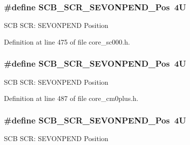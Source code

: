\subsubsection[{\texorpdfstring{S\+C\+B\+\_\+\+S\+C\+R\+\_\+\+S\+E\+V\+O\+N\+P\+E\+N\+D\+\_\+\+Pos}{SCB_SCR_SEVONPEND_Pos}}]{\setlength{\rightskip}{0pt plus 5cm}\#define S\+C\+B\+\_\+\+S\+C\+R\+\_\+\+S\+E\+V\+O\+N\+P\+E\+N\+D\+\_\+\+Pos~4U}\hypertarget{group___c_m_s_i_s___s_c_b_ga3bddcec40aeaf3d3a998446100fa0e44}{}\label{group___c_m_s_i_s___s_c_b_ga3bddcec40aeaf3d3a998446100fa0e44}
S\+CB S\+CR\+: S\+E\+V\+O\+N\+P\+E\+ND Position 

Definition at line 475 of file core\+\_\+sc000.\+h.

\subsubsection[{\texorpdfstring{S\+C\+B\+\_\+\+S\+C\+R\+\_\+\+S\+E\+V\+O\+N\+P\+E\+N\+D\+\_\+\+Pos}{SCB_SCR_SEVONPEND_Pos}}]{\setlength{\rightskip}{0pt plus 5cm}\#define S\+C\+B\+\_\+\+S\+C\+R\+\_\+\+S\+E\+V\+O\+N\+P\+E\+N\+D\+\_\+\+Pos~4U}\hypertarget{group___c_m_s_i_s___s_c_b_ga3bddcec40aeaf3d3a998446100fa0e44}{}\label{group___c_m_s_i_s___s_c_b_ga3bddcec40aeaf3d3a998446100fa0e44}
S\+CB S\+CR\+: S\+E\+V\+O\+N\+P\+E\+ND Position 

Definition at line 487 of file core\+\_\+cm0plus.\+h.

\subsubsection[{\texorpdfstring{S\+C\+B\+\_\+\+S\+C\+R\+\_\+\+S\+E\+V\+O\+N\+P\+E\+N\+D\+\_\+\+Pos}{SCB_SCR_SEVONPEND_Pos}}]{\setlength{\rightskip}{0pt plus 5cm}\#define S\+C\+B\+\_\+\+S\+C\+R\+\_\+\+S\+E\+V\+O\+N\+P\+E\+N\+D\+\_\+\+Pos~4U}\hypertarget{group___c_m_s_i_s___s_c_b_ga3bddcec40aeaf3d3a998446100fa0e44}{}\label{group___c_m_s_i_s___s_c_b_ga3bddcec40aeaf3d3a998446100fa0e44}
S\+CB S\+CR\+: S\+E\+V\+O\+N\+P\+E\+ND Position 

